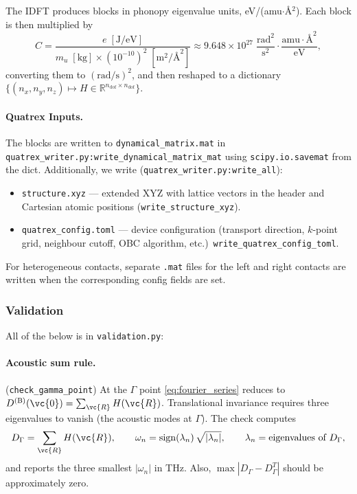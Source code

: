 The IDFT produces blocks in phonopy eigenvalue units,
eV/(amu$\cdot$\AA$^2$).  Each block is then multiplied by
\begin{equation}
  C = \frac{e\;[\text{J/eV}]}{m_u\;[\text{kg}] \times (10^{-10})^2\;[\text{m}^2/\text{\AA}^2]}
    \approx 9.648 \times 10^{27}\;\frac{\text{rad}^2}{\text{s}^2}
    \cdot \frac{\text{amu}\cdot\text{\AA}^2}{\text{eV}},
\end{equation}
converting them to $(\text{rad/s})^2$, and then reshaped to a dictionary
$\{(n_x,n_y,n_z) \mapsto H \in \mathbb{R}^{n_\text{dof}\times n_\text{dof}}\}$.

\paragraph{Quatrex Inputs.}
The blocks are written to \texttt{dynamical\_matrix.mat} in\\
\texttt{quatrex\_writer.py:write\_dynamical\_matrix\_mat}
using \texttt{scipy.io.savemat} from the dict.
Additionally, we write (\texttt{quatrex\_writer.py:write\_all}):
\begin{itemize}
  \item \texttt{structure.xyz} --- extended XYZ with lattice vectors in
        the header and Cartesian atomic positions
        (\texttt{write\_structure\_xyz}).
  \item \texttt{quatrex\_config.toml} --- device configuration
        (transport direction, $k$-point grid, neighbour cutoff, OBC
        algorithm, etc.)\ \texttt{write\_quatrex\_config\_toml}.
\end{itemize}
For heterogeneous contacts, separate \texttt{.mat} files
for the left and right contacts are written when the corresponding
config fields are set.



\subsubsection{Validation}
\label{sec:extraction_validation}

All of the below is in \texttt{validation.py}:

\paragraph{Acoustic sum rule.}
(\texttt{check\_gamma\_point})
At the $\Gamma$ point \eqref{eq:fourier_series} reduces to
$D^{(\mathrm{B})}(\vc{0}) = \sum_{\vc{R}} H(\vc{R})$.
Translational invariance requires three eigenvalues to vanish
(the acoustic modes at $\Gamma$).  The check computes
\begin{equation}
  D_\Gamma = \sum_{\vc{R}} H(\vc{R}),
  \qquad
  \omega_n = \mathrm{sign}(\lambda_n)\,
             \sqrt{|\lambda_n|},
  \qquad
  \lambda_n = \text{eigenvalues of } D_\Gamma,
\end{equation}
and reports the three smallest $|\omega_n|$ in THz.
Also, $\max|D_\Gamma - D_\Gamma^T|$ should be approximately zero.

